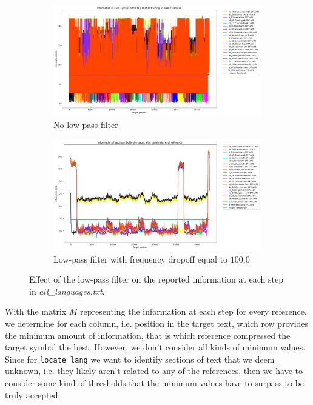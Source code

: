 \documentclass{article}
\begin{document}
\begin{figure}
    \centering
    \begin{subfigure}[b]{0.4\textwidth}
        \centering
        \includegraphics[width=\textwidth]{./images/no_freq_dropoff.png}
        \caption{No low-pass filter}
        \label{fig:no_freq_dropoff}
    \end{subfigure}
    \hfill
    \begin{subfigure}[b]{0.4\textwidth}
        \centering
        \includegraphics[width=\textwidth]{./images/freq_dropoff.png}
        \caption{Low-pass filter with frequency dropoff equal to $100.0$}
        \label{fig:freq_dropoff}
    \end{subfigure}
    \caption{Effect of the low-pass filter on the reported information at each step in \textit{all\_languages.txt}.}
    \label{fig:low_pass_filter_res}
\end{figure}

With the matrix $M$ representing the information at each step for every reference, we determine for each column, i.e. position in the target text, which row provides the minimum amount of information, that is which reference compressed the target symbol the best.
However, we don't consider all kinds of minimum values.
Since for \texttt{locate\_lang} we want to identify sections of text that we deem unknown, i.e. they likely aren't related to any of the references, then we have to consider some kind of thresholds that the minimum values have to surpass to be truly accepted.
\end{document}
